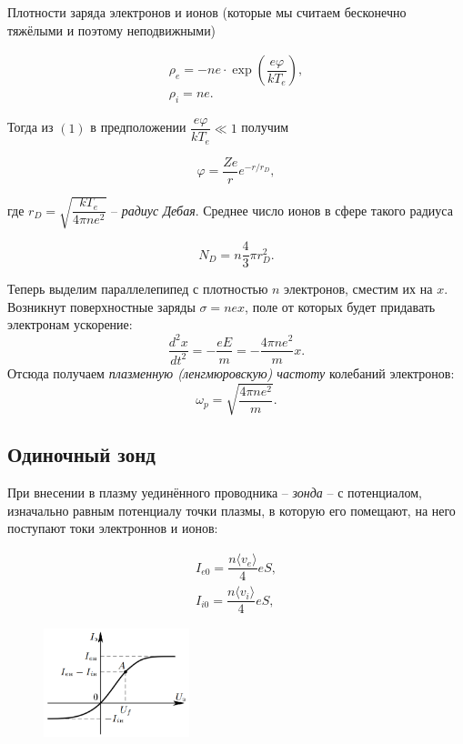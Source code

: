 \documentclass[a4paper]{article}
\theoremstyle{definition}
\theoremstyle{remark}
\begin{document}
Плотности заряда электронов и ионов (которые мы считаем бесконечно тяжёлыми и поэтому неподвижными)

\begin{equation}
\begin{array}{c}
    \rho_e = -ne \cdot \exp\left(\dfrac{e\varphi}{kT_e}\right),\\
    \rho_i = ne.
\end{array}
\end{equation}

Тогда из $(1)$ в предположении $\dfrac{e\varphi}{kT_e} \ll 1$ получим

\begin{equation}
    \varphi = \dfrac{Ze}{r}e^{-r/r_D},
\end{equation}

где $r_D = \sqrt{\dfrac{kT_e}{4\pi n e^2}}$ -- \textit{радиус Дебая}. Среднее число ионов в сфере такого радиуса 
  

\begin{equation}
    N_D = n\dfrac{4}{3}\pi r_D^2.
\end{equation}

Теперь выделим параллелепипед с плотностью $n$ электронов, сместим их на $x$. Возникнут поверхностные заряды $\sigma = nex$, поле от которых будет придавать электронам ускорение:
$$
\dfrac{d^2x}{dt^2}=-\dfrac{eE}{m}=-\dfrac{4\pi n e^2}{m}x.
$$ 
Отсюда получаем \textit{плазменную (ленгмюровскую) частоту} колебаний электронов:
\begin{equation}
\omega_p = \sqrt{\dfrac{4\pi ne^2}{m}}.
\end{equation}
 
\subsection{Одиночный зонд}

При внесении в плазму уединённого проводника -- \textit{зонда} -- с потенциалом, изначально равным потенциалу точки плазмы, в которую его помещают, на него поступают токи электроннов и ионов:

\begin{equation}
\begin{array}{c}
I_{e0} = \dfrac{n \langle v_e \rangle}{4}eS,\\
I_{i0} = \dfrac{n \langle v_i \rangle}{4}eS,
\end{array}
\end{equation}

\begin{figure}
    \centering
    \includegraphics[width = 120pt]{image/second.png}
\end{figure} 
\end{document}
